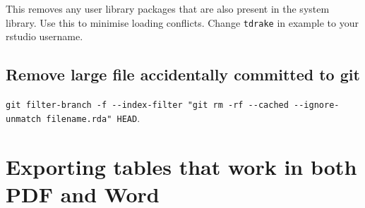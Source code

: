 \documentclass[
]{book}
\newenvironment{Shaded}{\begin{snugshade}}{\end{snugshade}}
\newcommand{\CommentTok}[1]{\textcolor[rgb]{0.56,0.35,0.01}{\textit{#1}}}
\newcommand{\ErrorTok}[1]{\textcolor[rgb]{0.64,0.00,0.00}{\textbf{#1}}}
\newcommand{\KeywordTok}[1]{\textcolor[rgb]{0.13,0.29,0.53}{\textbf{#1}}}
\newcommand{\NormalTok}[1]{#1}
\newcommand{\OperatorTok}[1]{\textcolor[rgb]{0.81,0.36,0.00}{\textbf{#1}}}
\newcommand{\StringTok}[1]{\textcolor[rgb]{0.31,0.60,0.02}{#1}}
\begin{document}
This removes any user library packages that are also present in the system library. Use this to minimise loading conflicts. Change \texttt{tdrake} in example to your rstudio username.

\begin{Shaded}
\end{Shaded}

\hypertarget{remove-large-file-accidentally-committed-to-git}{%
\subsection{Remove large file accidentally committed to git}\label{remove-large-file-accidentally-committed-to-git}}

\texttt{git\ filter-branch\ -f\ -\/-index-filter\ "git\ rm\ -rf\ -\/-cached\ -\/-ignore-unmatch\ filename.rda"\ HEAD}.

\hypertarget{exporting-tables-that-work-in-both-pdf-and-word}{%
\section{Exporting tables that work in both PDF and Word}\label{exporting-tables-that-work-in-both-pdf-and-word}}
\end{document}
